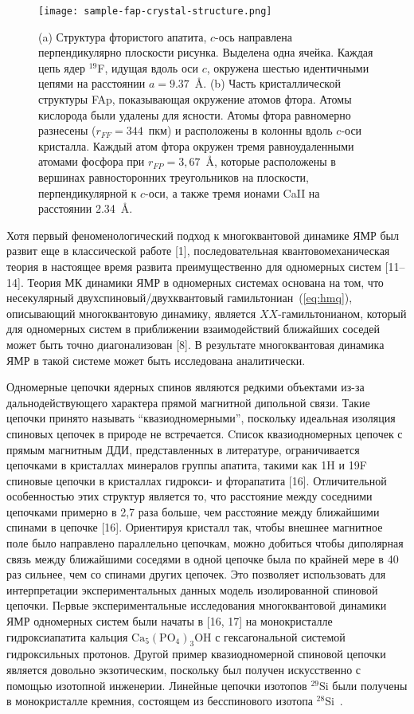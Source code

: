 \begin{figure}[ht]
  \texttt{[image: sample-fap-crystal-structure.png]}
  \caption{
    (a) Структура фтористого апатита, $c$-ось направлена перпендикулярно плоскости рисунка.
    Выделена одна ячейка.
    Каждая цепь ядер $^{19}$F, идущая вдоль оси $c$, окружена шестью идентичными цепями на расстоянии $a=9.37$~\r{A}.
    (b) Часть кристаллической структуры FAp, показывающая окружение атомов фтора. Атомы кислорода были удалены для ясности.
    Атомы фтора равномерно разнесены ($r_{FF}=344$~пкм) и расположены в колонны вдоль $c$-оси кристалла.
    Каждый атом фтора окружен тремя равноудаленными атомами фосфора при $r_{FP}=3,67$~\r{A},
    которые расположены в вершинах равносторонних треугольников на плоскости,
    перпендикулярной к $c$-оси, а также тремя ионами CaII на расстоянии 2.34~\r{A}.
  }
  \label{fig:sample-fap-crystal-structure}
\end{figure}
Хотя первый феноменологический подход к многоквантовой динамике ЯМР был развит еще в классической работе [1],
последовательная квантовомеханическая теория в настоящее время развита преимущественно для одномерных систем [11–14].
Теория МК динамики ЯМР в одномерных системах основана на том,
что несекулярный двухспиновый/двухквантовый гамильтониан~(\ref{eq:hmq}),
описывающий многоквантовую динамику,
является $XX$-гамильтонианом,
который для одномерных систем в приближении взаимодействий ближайших соседей может быть точно диагонализован [8].
В результате многоквантовая динамика ЯМР в такой системе может быть исследована аналитически.

Одномерные цепочки ядерных спинов являются редкими объектами из-за дальнодействующего характера прямой магнитной дипольной связи.
Такие цепочки принято называть ``квазиодномерными'', поскольку идеальная изоляция спиновых цепочек в природе не встречается.
Cписок квазиодномерных цепочек с прямым магнитным ДДИ,
представленных в литературе,
ограничивается цепочками в кристаллах минералов группы апатита,
такими как 1H и 19F спиновые цепочки в кристаллах гидрокси- и фторапатита [16].
Отличительной особенностью этих структур является то, что расстояние между соседними цепочками примерно в 2,7 раза больше, чем расстояние между ближайшими спинами в цепочке [16]. Ориентируя кристалл так,
чтобы внешнее магнитное поле было направлено параллельно цепочкам,
можно добиться чтобы диполярная связь между ближайшими соседями в одной цепочке была по крайней мере в 40 раз сильнее,
чем со спинами других цепочек.
%
Это позволяет использовать для интерпретации экспериментальных данных модель изолированной спиновой цепочки.
Пeрвые экспериментальные исследования многоквантовой динамики ЯМР одномерных систем были начаты в [16, 17] на монокристалле гидроксиапатита кальция $\mathrm{Ca}_5(\mathrm{PO}_4)_3\mathrm{OH}$ с гексагональной системой гидроксильных протонов.
Другой пример квазиодномерной спиновой цепочки является довольно экзотическим,
поскольку был получен искусственно с помощью изотопной инженерии.
Линейные цепочки изотопов $^{29}$Si были получены в монокристалле кремния, состоящем из бесспинового изотопа $^28$Si~\cite{Itoh2005}.

